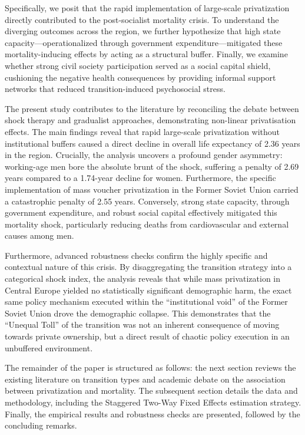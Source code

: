 \documentclass[en,magisterska]{pracamgr}
\begin{document}
Specifically, we posit that the rapid implementation of large-scale privatization directly contributed to the post-socialist mortality crisis. To understand the diverging 
outcomes across the region, we further hypothesize that high state capacity—operationalized through government expenditure—mitigated these mortality-inducing effects by acting 
as a structural buffer. Finally, we examine whether strong civil society participation served as a social capital shield, cushioning the negative health consequences by providing 
informal support networks that reduced transition-induced psychosocial stress.

The present study contributes to the literature by reconciling the debate between shock therapy and gradualist approaches, demonstrating non-linear privatisation effects. The main findings reveal that rapid large-scale privatization without 
institutional buffers caused a direct decline in overall life expectancy of 2.36 years in the region. Crucially, the analysis uncovers a profound gender asymmetry: 
working-age men bore the absolute brunt of the shock, suffering a penalty of 2.69 years compared to a 1.74-year decline for women. Furthermore, 
the specific implementation of mass voucher privatization in the Former Soviet Union carried a catastrophic penalty of 2.55 years. Conversely, 
strong state capacity, through government expenditure, and robust social capital effectively mitigated this mortality shock, particularly reducing 
deaths from cardiovascular and external causes among men.

Furthermore, advanced robustness checks confirm the highly specific and contextual nature of this crisis. By disaggregating the transition strategy into a categorical shock index, 
the analysis reveals that while mass privatization in Central Europe yielded no statistically significant demographic harm, the exact same policy mechanism executed within the ``institutional void'' 
of the Former Soviet Union drove the demographic collapse. This demonstrates that the ``Unequal Toll'' of the transition was not an inherent consequence of moving towards private ownership, but a 
direct result of chaotic policy execution in an unbuffered environment.

The remainder of the paper is structured as follows: the next section reviews the existing literature on transition types and academic debate on the association between privatization and mortality. 
The subsequent section details the data and methodology, including the Staggered Two-Way Fixed Effects estimation strategy. Finally, the empirical results and robustness checks are presented, 
followed by the concluding remarks.
\end{document}
